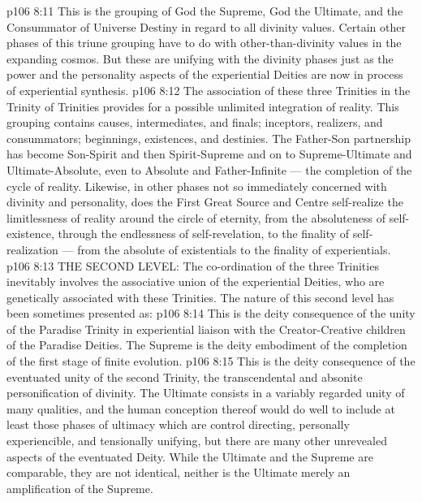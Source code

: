 \vs p106 8:11 \bibnobreakspace {} This is the grouping of God the Supreme, God the Ultimate, and the Consummator of Universe Destiny in regard to all divinity values. Certain other phases of this triune grouping have to do with other\hyp{}than\hyp{}divinity values in the expanding cosmos. But these are unifying with the divinity phases just as the power and the personality aspects of the experiential Deities are now in process of experiential synthesis.
\vs p106 8:12 \pc The association of these three Trinities in the Trinity of Trinities provides for a possible unlimited integration of reality. This grouping contains causes, intermediates, and finals; inceptors, realizers, and consummators; beginnings, existences, and destinies. The Father\hyp{}Son partnership has become Son\hyp{}Spirit and then Spirit\hyp{}Supreme and on to Supreme\hyp{}Ultimate and Ultimate\hyp{}Absolute, even to Absolute and Father\hyp{}Infinite --- the completion of the cycle of reality. Likewise, in other phases not so immediately concerned with divinity and personality, does the First Great Source and Centre self\hyp{}realize the limitlessness of reality around the circle of eternity, from the absoluteness of self\hyp{}existence, through the endlessness of self\hyp{}revelation, to the finality of self\hyp{}realization --- from the absolute of existentials to the finality of experientials.
\vs p106 8:13 \pc THE SECOND LEVEL: The co\hyp{}ordination of the three Trinities inevitably involves the associative union of the experiential Deities, who are genetically associated with these Trinities. The nature of this second level has been sometimes presented as:
\vs p106 8:14 \bibnobreakspace {} This is the deity consequence of the unity of the Paradise Trinity in experiential liaison with the Creator\hyp{}Creative children of the Paradise Deities. The Supreme is the deity embodiment of the completion of the first stage of finite evolution.
\vs p106 8:15 \bibnobreakspace {} This is the deity consequence of the eventuated unity of the second Trinity, the transcendental and absonite personification of divinity. The Ultimate consists in a variably regarded unity of many qualities, and the human conception thereof would do well to include at least those phases of ultimacy which are control directing, personally experiencible, and tensionally unifying, but there are many other unrevealed aspects of the eventuated Deity. While the Ultimate and the Supreme are comparable, they are not identical, neither is the Ultimate merely an amplification of the Supreme.
